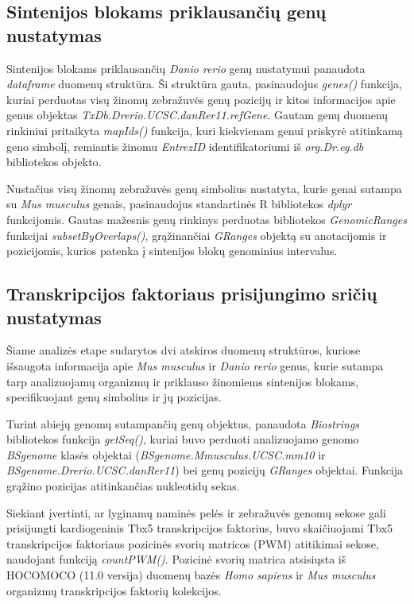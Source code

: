 \documentclass[12pt]{article}
\begin{document}
\subsection{Sintenijos blokams priklausančių genų nustatymas}
Sintenijos blokams priklausančių \emph{Danio rerio} genų nustatymui panaudota
\emph{dataframe} duomenų struktūra. Ši struktūra gauta, pasinaudojus
\emph{genes()} funkcija, kuriai perduotas visų žinomų zebražuvės genų pozicijų
ir kitos informacijos apie genus objektas
\emph{TxDb.Drerio.UCSC.danRer11.\-refGene}\cite{REF_GENE}. Gautam genų duomenų
rinkiniui pritaikyta \emph{mapIds()} funkcija, kuri kiekvienam genui priskyrė
atitinkamą geno simbolį, remiantis žinomu \emph{EntrezID} identifikatoriumi iš
\emph{org.Dr.eg.db}\cite{DR_ANNOT} bibliotekos objekto.

Nustačius visų žinomų zebražuvės genų simbolius nustatyta, kurie genai sutampa
su \emph{Mus musculus} genais, pasinaudojus standartinės R bibliotekos
\emph{dplyr}\cite{DPLYR} funkcijomis. Gautas mažesnis genų rinkinys perduotas
bibliotekos \emph{GenomicRanges}\cite{GRANGES} funkcijai
\emph{subsetByOverlaps()}, grąžinančiai \emph{GRanges} objektą su anotacijomis
ir pozicijomis, kurios patenka į sintenijos blokų genominius intervalus.

\subsection{Transkripcijos faktoriaus prisijungimo sričių nustatymas}
Šiame analizės etape sudarytos dvi atskiros duomenų struktūros, kuriose
išsaugota informacija apie \emph{Mus musculus} ir \emph{Danio rerio} genus,
kurie sutampa tarp analizuojamų organizmų ir priklauso žinomiems sintenijos
blokams, specifikuojant genų simbolius ir jų pozicijas.

Turint abiejų genomų sutampančių genų objektus, panaudota
\emph{Biostrings}\cite{BIOSTRINGS}
bibliotekos funkcija \emph{getSeq()}, kuriai buvo perduoti analizuojamo genomo
\emph{BSgenome}\cite{BSGENOME} klasės objektai
(\emph{BSgenome.Mmusculus.UCSC.mm10} ir \emph{BSgenome.Drerio.UCSC.danRer11})
bei genų pozicijų \emph{GRanges} objektai. Funkcija grąžino pozicijas
atitinkančias nukleotidų sekas.

Siekiant įvertinti, ar lyginamų naminės pelės ir zebražuvės genomų sekose gali
prisijungti kardiogeninis Tbx5 transkripcijos faktorius, buvo skaičiuojami Tbx5
transkripcijos faktoriaus pozicinės svorių matricos (PWM) atitikimai sekose,
naudojant funkciją \emph{countPWM()}. Pozicinė svorių matrica atsisiųsta iš
HOCOMOCO\cite{HOCOMOCO} (11.0 versija) duomenų bazės \emph{Homo sapiens} ir
\emph{Mus musculus} organizmų transkripcijos faktorių kolekcijos.
\end{document}
